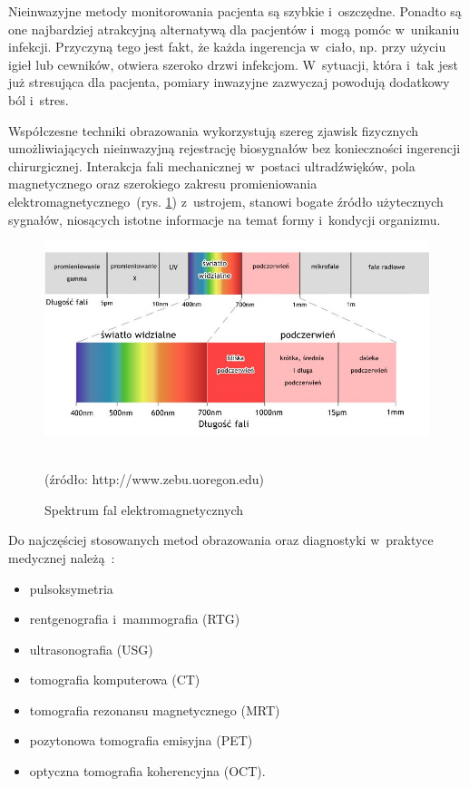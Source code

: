 Nieinwazyjne metody monitorowania pacjenta są szybkie i~oszczędne. Ponadto są one najbardziej atrakcyjną alternatywą dla pacjentów i~mogą pomóc 
w~unikaniu infekcji. Przyczyną tego jest fakt, że każda ingerencja w~ciało, np. przy użyciu igieł lub cewników, otwiera szeroko drzwi infekcjom. 
W~sytuacji, która i~tak jest już stresująca dla pacjenta, pomiary inwazyjne zazwyczaj powodują dodatkowy ból i~stres.

Współczesne techniki obrazowania wykorzystują szereg zjawisk fizycznych umożliwiających nieinwazyjną rejestrację biosygnałów bez konieczności 
ingerencji chirurgicznej. Interakcja fali mechanicznej w~postaci ultradźwięków, pola magnetycznego oraz szerokiego zakresu promieniowania 
elektromagnetycznego~(rys. \ref{rys:spectrum}) z~ustrojem, stanowi bogate źródło użytecznych sygnałów, niosących istotne informacje na temat 
formy i~kondycji organizmu.
\begin{figure}[!h]
	\centerline{\includegraphics[scale = 0.56]{graphic/spectrum.jpg}}
	\caption{Spektrum fal elektromagnetycznych}
	~\\	
	(źródło: http://www.zebu.uoregon.edu)
	\label{rys:spectrum}
\end{figure}

\noindent Do najczęściej stosowanych metod obrazowania oraz diagnostyki w~praktyce medycznej należą~\cite{SzGa11}:
\begin{itemize}
	\item pulsoksymetria
	\item rentgenografia i~mammografia (RTG)
	\item ultrasonografia (USG)
	\item tomografia komputerowa (CT)
	\item tomografia rezonansu magnetycznego (MRT)
	\item pozytonowa tomografia emisyjna (PET)
	\item optyczna tomografia koherencyjna (OCT).\\
\end{itemize}

